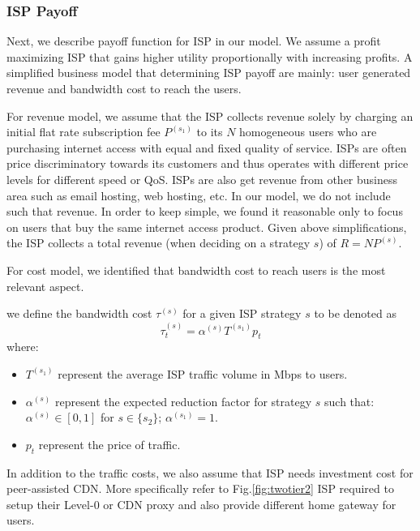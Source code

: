 \documentclass[paper]{ieice}
\begin{document}
\subsubsection{ISP Payoff}
Next, we describe payoff function for ISP in our model.  
We assume a profit maximizing ISP that gains higher utility proportionally with increasing profits. 
A simplified business model that determining ISP payoff are mainly: user generated revenue and bandwidth cost to reach the users.

For revenue model, we assume that the ISP collects revenue solely by charging an initial flat rate subscription fee $P^{(s_1)}$ to its $N$ homogeneous users who are purchasing internet access with equal and fixed quality of service.
ISPs are often price discriminatory towards its customers and thus operates with different price levels for different speed or QoS.
ISPs are also get revenue from other business area such as email hosting, web hosting, etc. 
In our model, we do not include such that revenue. 
In order to keep simple, we found it reasonable only to focus on users that buy the same internet access product. 
Given above simplifications, the ISP collects a total revenue (when deciding on a strategy $s$) of $R = N P^{(s)}$.

For cost model, we identified that bandwidth cost to reach users is the most relevant aspect. 

\newtheorem{theorem3}{Definition}
\begin{theorem}
we define the bandwidth cost $\tau^{(s)}$ for a given ISP strategy $s$ to be denoted as 
\begin{equation}\label{eq:transitcost}
	\tau^{(s)}_t = \alpha^{(s)}T^{(s_1)} p_t
\end{equation}
where:
\begin{itemize}
	\item $T^{(s_1)}$ represent the average ISP traffic volume in Mbps to users.
	\item $\alpha^{(s)}$ represent the expected reduction factor for strategy $s$ such that: $\alpha^{(s)} \in [0,1]$ for $s \in \{s_2\}$;  $\alpha^{(s_1)} = 1$.
	\item $p_t$ represent the price of traffic.
\end{itemize}
\end{theorem}

In addition to the traffic costs, we also assume that ISP needs investment cost for peer-assisted CDN.
More specifically refer to Fig.\ref{fig:twotier2} ISP required to setup their Level-0 or CDN proxy and also provide different home gateway for users.
\end{document}
